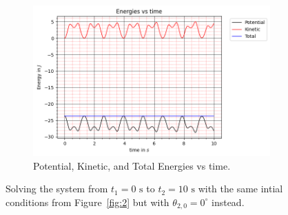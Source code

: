 \begin{figure}[H]
\begin{subfigure}[b]{0.49\textwidth}
        \centering
        \includegraphics[width=\textwidth]{figures/initial-conditions-b/Energies vs Time.png}
        \caption{Potential, Kinetic, and Total Energies vs time.}
        \label{fig:3e}
    \end{subfigure}
    \caption{Solving the system from $t_1 = 0\text{ s}$ to $t_2 = 10\text{ s}$ with the same intial conditions from Figure~\ref{fig:2} but with $\theta_{2,0} = 0^\circ$ instead.}
    \label{fig:3}
\end{figure}
